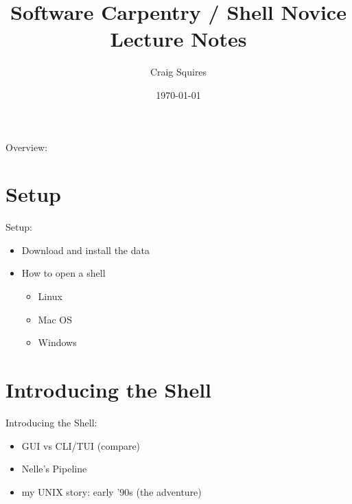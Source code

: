 \documentclass[
 size=12pt,
 paper=screen,
 mode=present,
 display=slidesnotes,
 style=paintings,
 nohandoutpagebreaks,
]{powerdot}
\title{Software Carpentry / Shell Novice \\ Lecture Notes}
\author{Craig Squires}
\date{\today}
\begin{document}
\maketitle

\begin{slide}{Overview:}
  \tableofcontents[content=sections]
\end{slide}

\section[slide=false]{Setup}

\begin{slide}{Setup:}
  \begin{itemize}
     \item Download and install the data
     \item How to open a shell
       \begin{itemize}
          \item Linux
          \item Mac OS
          \item Windows
       \end{itemize}
  \end{itemize}
\end{slide}

\section[slide=false]{Introducing the Shell}

\begin{slide}{Introducing the Shell:}
  \begin{itemize}
     \item GUI vs CLI/TUI (compare)
     \item Nelle's Pipeline
     \item my UNIX story: early '90s (the adventure)
  \end{itemize}
\end{slide}
\end{document}
